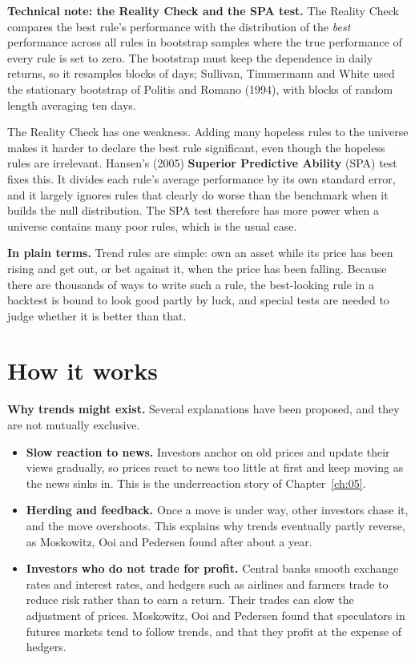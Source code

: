 \begin{technote}
\textbf{Technical note: the Reality Check and the SPA test.} The Reality Check compares the best rule's performance with the distribution of the \emph{best} performance across all rules in bootstrap samples where the true performance of every rule is set to zero. The bootstrap must keep the dependence in daily returns, so it resamples blocks of days; Sullivan, Timmermann and White used the stationary bootstrap of Politis and Romano (1994), with blocks of random length averaging ten days.

The Reality Check has one weakness. Adding many hopeless rules to the universe makes it harder to declare the best rule significant, even though the hopeless rules are irrelevant. Hansen's (2005) \textbf{Superior Predictive Ability} (SPA) test fixes this. It divides each rule's average performance by its own standard error, and it largely ignores rules that clearly do worse than the benchmark when it builds the null distribution. The SPA test therefore has more power when a universe contains many poor rules, which is the usual case.
\end{technote}

\noindent\textbf{In plain terms.} Trend rules are simple: own an asset while its price has been rising and get out, or bet against it, when the price has been falling. Because there are thousands of ways to write such a rule, the best-looking rule in a backtest is bound to look good partly by luck, and special tests are needed to judge whether it is better than that.

\section{How it works}
\label{sec:08-how}

\textbf{Why trends might exist.} Several explanations have been proposed, and they are not mutually exclusive.

\begin{itemize}
  \item \textbf{Slow reaction to news.} Investors anchor on old prices and update their views gradually, so prices react to news too little at first and keep moving as the news sinks in. This is the underreaction story of Chapter~\ref{ch:05}.
  \item \textbf{Herding and feedback.} Once a move is under way, other investors chase it, and the move overshoots. This explains why trends eventually partly reverse, as Moskowitz, Ooi and Pedersen found after about a year.
  \item \textbf{Investors who do not trade for profit.} Central banks smooth exchange rates and interest rates, and hedgers such as airlines and farmers trade to reduce risk rather than to earn a return. Their trades can slow the adjustment of prices. Moskowitz, Ooi and Pedersen found that speculators in futures markets tend to follow trends, and that they profit at the expense of hedgers.
\end{itemize}

